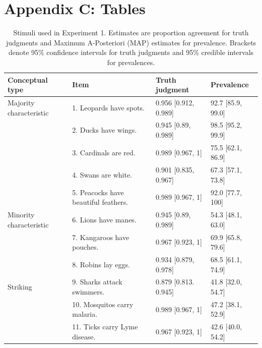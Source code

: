 \documentclass[12pt,letterpaper]{article}
\begin{document}
\newpage

\section*{Appendix C: Tables}




\begin{table}[h]
\centering

\caption{Stimuli used in Experiment 1. 
Estimates are proportion agreement for truth judgments and Maximum A-Posteriori (MAP) estimates for prevalence. 
Brackets denote 95\% confidence intervals for truth judgments and 95\% credible intervals for prevalences.}
\begin{tabular}{| l | l | p{3.5cm} | p{3.5cm} |}
\hline
Conceptual type & Item & Truth judgment & Prevalence \\
\hline \hline
Majority characteristic       & 1. Leopards have spots.    &0.956	[0.912, 0.989] & 92.7 [85.9, 99.0]\\
                                          & 2. Ducks have wings.                       &0.945	[0.89, 0.989] & 98.5 [95.2, 99.9]\\
                                          & 3. Cardinals are red.                       &0.989	[0.967, 1] & 75.5 [62.1, 86.9]\\
                                          & 4. Swans are white.                       &0.901	[0.835, 0.967] & 67.3 [57.1, 73.8] \\
                                          & 5. Peacocks have beautiful feathers. &  0.989	[0.967, 1] & 92.0 [77.7, 100] \\
Minority characteristic       & 6. Lions have manes.       &0.945	[0.89, 0.989] & 54.3 [48.1, 63.0]\\
                                          & 7. Kangaroos have pouches.                        &0.967 [0.923, 1]& 69.9 [65.8, 79.6]\\
                                          & 8. Robins lay eggs.                        &0.934	[0.879, 0.978]& 68.5 [61.1, 74.9]\\
Striking                      & 9. Sharks attack swimmers. &0.879	[0.813. 0.945] & 41.8 [32.0, 54.7]\\
                                  & 10. Mosquitos carry malaria.                        &0.989	[0.967, 1] & 47.2 [38.1,	 52.9]\\
                                  & 11. Ticks carry Lyme disease.                        &0.967	[0.923, 1] &  42.6 [40.0, 54.2]\\

\end{tabular}
\end{table}
\end{document}
